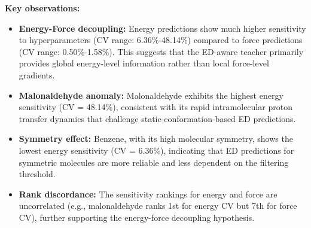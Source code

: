\textbf{Key observations:}
\begin{itemize}
    \item \textbf{Energy-Force decoupling:} Energy predictions show much higher sensitivity to hyperparameters (CV range: 6.36\%-48.14\%) compared to force predictions (CV range: 0.50\%-1.58\%). This suggests that the ED-aware teacher primarily provides global energy-level information rather than local force-level gradients.
    \item \textbf{Malonaldehyde anomaly:} Malonaldehyde exhibits the highest energy sensitivity (CV = 48.14\%), consistent with its rapid intramolecular proton transfer dynamics that challenge static-conformation-based ED predictions.
    \item \textbf{Symmetry effect:} Benzene, with its high molecular symmetry, shows the lowest energy sensitivity (CV = 6.36\%), indicating that ED predictions for symmetric molecules are more reliable and less dependent on the filtering threshold.
    \item \textbf{Rank discordance:} The sensitivity rankings for energy and force are uncorrelated (e.g., malonaldehyde ranks 1st for energy CV but 7th for force CV), further supporting the energy-force decoupling hypothesis.
\end{itemize}



